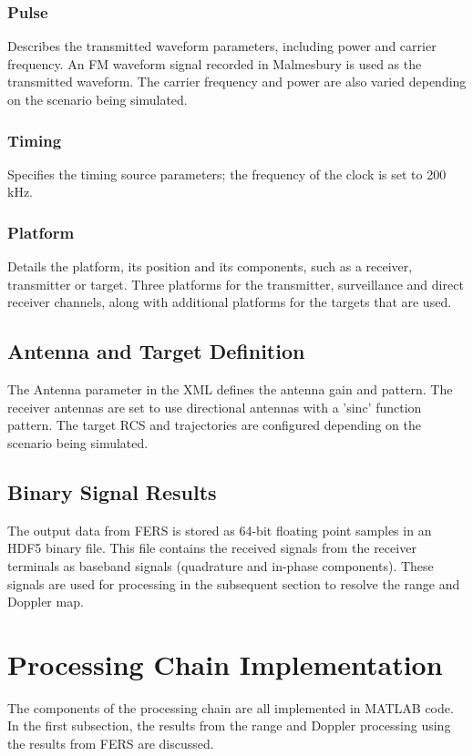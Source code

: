 \subsubsection{Pulse}
Describes the transmitted waveform parameters, including power and carrier frequency. An \ac{FM} waveform signal recorded in Malmesbury is used as the transmitted waveform. The carrier frequency and power are also varied depending on the scenario being simulated.

\subsubsection{Timing}
Specifies the timing source parameters; the frequency of the clock is set to 200 kHz.

\subsubsection{Platform}
Details the platform, its position and its components, such as a receiver, transmitter or target. Three platforms for the transmitter, surveillance and direct receiver channels, along with additional platforms for the targets that are used.

\subsection{Antenna and Target Definition}
The Antenna parameter in the XML defines the antenna gain and pattern. The receiver antennas are set to use directional antennas with a 'sinc' function pattern. The target \ac{RCS} and trajectories are configured depending on the scenario being simulated.

\subsection{Binary Signal Results}
The output data from \ac{FERS} is stored as 64-bit floating point samples in an HDF5 binary file. This file contains the received signals from the receiver terminals as baseband signals (quadrature and in-phase components). These signals are used for processing in the subsequent section to resolve the range and Doppler map.


\section{Processing Chain Implementation}
The components of the processing chain are all implemented in MATLAB code. In the first subsection, the results from the range and Doppler processing using the results from \ac{FERS} are discussed.

